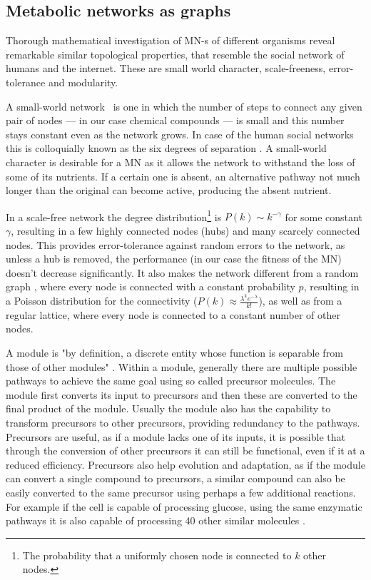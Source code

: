 \documentclass[a4paper,12pt]{article}
\begin{document}
	\subsection{Metabolic networks as graphs}
	Thorough mathematical investigation of MN-s of different organisms reveal remarkable similar topological properties, that resemble the social network of humans and the internet. These are small world character, scale-freeness, error-tolerance and modularity\cite{largescale}.	

	A small-world network \cite{smallworld}~is one in which the number of steps to connect any given pair of nodes --- in our case chemical compounds --- is small and this number stays constant even as the network grows. In case of the human social networks this is colloquially known as the six degrees of separation \cite{sixdegrees}. A small-world character is desirable for a MN as it allows the network to withstand the loss of some of its nutrients. If a certain one is absent, an alternative pathway not much longer than the original can become active, producing the absent nutrient. %
	 
	In a scale-free network the degree distribution\footnote{The probability that a uniformly chosen node is connected to $k$ other nodes.} is $P(k)\sim k^{-\gamma}$ for some constant $\gamma$, resulting in a few highly connected nodes (hubs) and many scarcely connected nodes. This provides error-tolerance against random errors to the network, as unless a hub is removed, the performance (in our case the fitness of the MN) doesn't decrease significantly. It also makes the network different from a random graph \cite{randomgraphs}, where every node is connected with a constant probability $p$, resulting in a Poisson distribution for the connectivity ($P(k) \approx \frac{\lambda^k e^{-\lambda}}{k!} $), as well as from a regular lattice, where every node is connected to a constant number of other nodes.
	 
	A module is "by definition, a discrete entity whose function is separable from those of other modules" \cite{modulardef}. Within a module, generally there are multiple possible pathways to achieve the same goal using so called precursor molecules. The module first converts its input to precursors and then these are converted to the final product of the module. Usually the module also has the capability to transform precursors to other precursors, providing redundancy to the pathways. Precursors are useful, as if a module lacks one of its inputs, it is possible that through the conversion of other precursors it can still be functional, even if it at a reduced efficiency. Precursors also help evolution and adaptation, as if the module can convert a single compound to precursors, a similar compound can also be easily converted to the same precursor using perhaps a few additional reactions. For example if the cell is capable of processing glucose, using the same enzymatic pathways it is also capable of processing 40 other similar molecules \cite{latent}.
	
\end{document}
